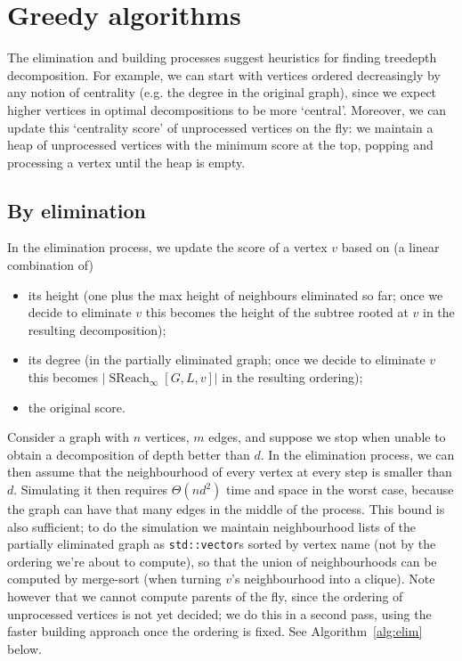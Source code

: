 \documentclass{timgad}
\DeclareMathOperator{\SReach}{SReach}
\begin{document}
\section{Greedy algorithms}
The elimination and building processes suggest heuristics for finding treedepth decomposition.
For example, we can start with vertices ordered decreasingly by any notion of centrality (e.g. the degree in the original graph), since we expect higher vertices in optimal decompositions to be more `central'.
Moreover, we can update this `centrality score' of unprocessed vertices on the fly: we maintain a heap of unprocessed vertices with the minimum score at the top, popping and processing a vertex until the heap is empty.
\subsection{By elimination}
In the elimination process, we update the score of a vertex $v$ based on (a linear combination of) 
\begin{itemize}
\item its height (one plus the max height of neighbours eliminated so far; once we decide to eliminate $v$ this becomes the height of the subtree rooted at $v$ in the resulting decomposition);
\item its degree (in the partially eliminated graph; once we decide to eliminate $v$ this becomes $|\SReach_{\infty}[G,L,v]|$ in the resulting ordering);
\item the original score.
\end{itemize} 

Consider a graph with $n$ vertices, $m$ edges, and suppose we stop when unable to obtain a decomposition of depth better than $d$.
In the elimination process, we can then assume that the neighbourhood of every vertex at every step is smaller than $d$.
Simulating it then requires $\Theta(nd^2)$ time and space in the worst case,
because the graph can have that many edges in the middle of the process.
This bound is also sufficient; to do the simulation we maintain neighbourhood lists of the partially eliminated graph
as \texttt{std::vector}s sorted by vertex name (not by the ordering we're about to compute), so that the union of neighbourhoods can be computed by merge-sort (when turning $v$'s neighbourhood into a clique).
Note however that we cannot compute parents of the fly, since the ordering of unprocessed vertices is not yet decided;
we do this in a second pass, using the faster building approach once the ordering is fixed.
See Algorithm~\ref{alg:elim} below.
\end{document}
